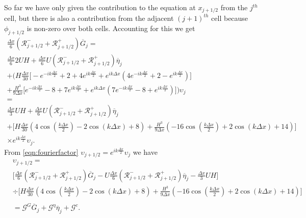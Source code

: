 So far we have only given the contribution to the equation at $x_{j+1/2}$ from the $j^{th}$ cell, but there is also a contribution from the adjacent $(j+1)^{th}$ cell because $\phi_{j+1/2}$ is non-zero over both cells. Accounting for this we get
\begin{multline*}
\frac{\Delta x}{6} \left(\mathcal{R}^-_{j +1/2} + \mathcal{R}^+_{j +1/2} \right)\overline{G}_{j} = \\
\frac{\Delta x}{6} 2UH   + \frac{\Delta x}{6} U \left(\mathcal{R}^-_{j +1/2} + \mathcal{R}^+_{j +1/2} \right)\overline{\eta}_{j} \\ +   \Bigg(H\frac{\Delta x}{30} \Bigg[ -e^{-ik\frac{\Delta x}{2}} +  2 + 4e^{ik\frac{\Delta x}{2}} + e^{ik{\Delta x}}\left(4e^{-ik\frac{\Delta x}{2}} +  2 - e^{ik\frac{\Delta x}{2}}\right) \Bigg]   \\ + \frac{H^3 }{9\Delta x} \Bigg[  e^{-ik\frac{\Delta x}{2}} -8 + 7e^{ik\frac{\Delta x}{2}}  + e^{ik{\Delta x}}\left(7e^{-ik\frac{\Delta x}{2}} -8 + e^{ik\frac{\Delta x}{2}}  \right)  \Bigg]    \Bigg) \upsilon_j
\\  = \\
\frac{\Delta x}{3}UH   + \frac{\Delta x}{6} U \left(\mathcal{R}^-_{j +1/2} + \mathcal{R}^+_{j +1/2}\right)\overline{\eta}_{j}  \\ +  \Bigg[H\frac{\Delta x}{30} \left( 4\cos\left(\frac{k \Delta x}{2}\right) - 2\cos\left({k \Delta x}\right) + 8\right)   + \frac{H^3 }{9\Delta x} \left(-16\cos\left(\frac{k\Delta x}{2}\right) + 2 \cos\left(k \Delta x\right) + 14\right) \Bigg] \\ \times e^{i k \frac{\Delta x}{2}} \upsilon_{j}.
\end{multline*}
From \eqref{eqn:fourierfactor} $\upsilon_{j+1/2} = e^{i k \frac{\Delta x}{2}} \upsilon_{j} $ we have 
\begin{align}
\label{eqn:2ndFEMutoG}
&\upsilon_{j+1/2} =  \nonumber\\
&\Bigg[\frac{\Delta x}{6} \left(\mathcal{R}^-_{j +1/2} + \mathcal{R}^+_{j +1/2}\right)  \overline{G}_{j} \nonumber - U\frac{\Delta x}{6} \left(\mathcal{R}^-_{j +1/2} + \mathcal{R}^+_{j +1/2} \right)  \overline{\eta}_{j}   - \frac{\Delta x}{3}UH  \Bigg] \nonumber\\
 &\div  \Bigg[H\frac{\Delta x}{30} \left( 4\cos\left(\frac{k \Delta x}{2}\right) - 2\cos\left({k \Delta x}\right) + 8\right)  + \frac{H^3 }{9\Delta x}\left(-16\cos\left(\frac{k\Delta x}{2}\right) + 2 \cos\left(k \Delta x\right) + 14\right)    \Bigg]
\nonumber \\ \nonumber\\& =  \mathcal{G}^G \overline{G}_{j} + \mathcal{G}^{\eta} \overline{\eta}_{j} + \mathcal{G}^c .
\end{align}
 

